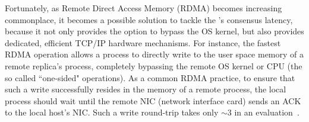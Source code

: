 



Fortunately, as Remote Direct Access Memory (RDMA) becomes increasing
commonplace, it becomes a possible solution to tackle the \paxos's consensus
latency, because it not only provides the option to bypass the OS kernel, but
also provides dedicated, efficient TCP/IP hardware mechanisms. For instance,
the fastest RDMA operation allows a process to directly write to the user space
memory of a remote replica's process, completely bypassing the remote OS kernel
or CPU (the so called ``one-sided" operations). As a common RDMA practice, to
ensure that such a write successfully resides in the memory of a remote
process, the local process should wait until the remote NIC (network interface
card) sends an ACK to the local host's NIC. Such a write round-trip takes only
$\sim$3 \us in an evaluation~\cite{pilaf:usenix14}.


